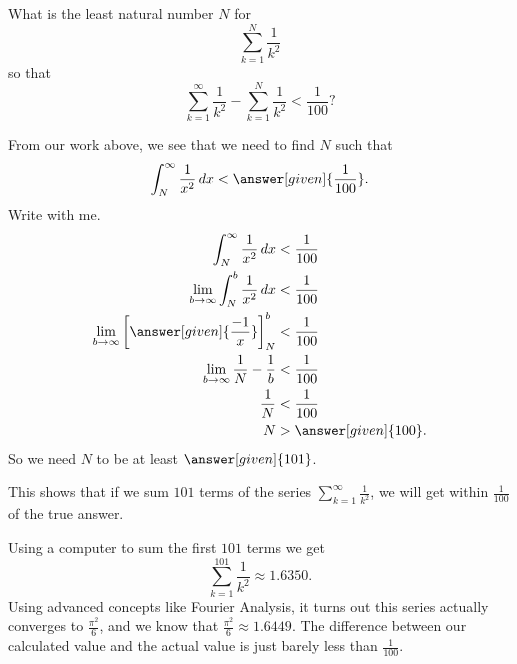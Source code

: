 \documentclass{ximera}
\begin{document}
\begin{example}
  What is the least natural number $N$ for 
  \[
  \sum_{k=1}^N \frac{1}{k^2}
  \]
  so that
  \[
  \sum_{k=1}^\infty \frac{1}{k^2} - \sum_{k=1}^N \frac{1}{k^2} <
  \frac{1}{100} ?
  \]
  \begin{explanation}
    From our work above, we see that we need to find $N$ such that
    \[
    \int_N^\infty \frac{1}{x^2} \d x < \answer[given]{\frac{1}{100}}.
    \]
    Write with me.
    \begin{align*}
      \int_N^\infty \frac{1}{x^2} \d x &< \frac{1}{100}\\
      \lim_{b \to \infty} \int_N^b \frac{1}{x^2} \d x &< \frac{1}{100}\\
      \lim_{b \to \infty} \eval{\answer[given]{\frac{-1}{x}}}_N^b& < \frac{1}{100}\\
      \lim_{b \to \infty} \frac{1}{N} - \frac{1}{b}& < \frac{1}{100}\\
      \frac{1}{N} &< \frac{1}{100}\\
      N&>\answer[given]{100}.
    \end{align*}
    So we need $N$ to be at least $\answer[given]{101}$.
  \end{explanation}
\end{example}

This shows that if we sum $101$ terms of the series $\sum_{k=1}^\infty
\frac{1}{k^2}$, we will get within $\frac{1}{100}$ of the true answer.

  Using a
computer to sum the first $101$ terms we get
\[
\sum_{k=1}^{101} \frac{1}{k^2} \approx 1.6350.
\]
Using advanced concepts like Fourier Analysis, it turns out this series 
actually converges to $\frac{\pi^2}{6}$, and we know that $\frac{\pi^2}{6} \approx 1.6449$.  
The difference between our calculated value and the actual value is just
barely less than $\frac{1}{100}$.
\end{document}
